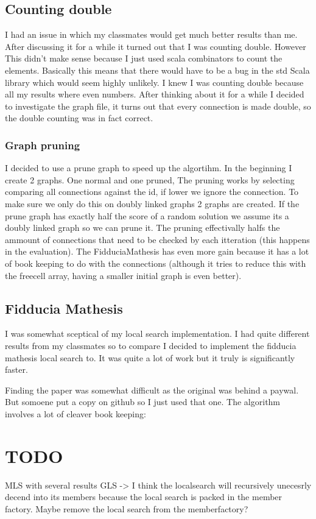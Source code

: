 \documentclass{article}
\begin{document}
\begin{empfile}
\subsection{Counting double}
I had an issue in which my classmates would get much better results than me.
After discussing it for a while it turned out that I was counting double. However
This didn't make sense because I just used scala combinators to count the 
elements. Basically this means that there would have to be a bug in the std
Scala library which would seem highly unlikely. I knew I was counting double
because all my results where even numbers. After thinking about it for a while
I decided to investigate the graph file, it turns out that every connection
is made double, so the double counting was in fact correct.

\subsubsection{Graph pruning}
I decided to use a prune graph to speed up the algortihm. In the beginning I
create 2 graphs. One normal and one pruned, The pruning works by selecting
comparing all connections against the id, if lower we ignore the connection.
To make sure we only do this on doubly linked graphs 2 graphs are created.
If the prune graph has exactly half the score of a random solution we assume
its a doubly linked graph so we can prune it.
The pruning effectivally halfs the ammount of connections that need to be
checked by each itteration (this happens in the evaluation). The
FidduciaMathesis has even more gain because it has a lot of book keeping to
do with the connections (although it tries to reduce this with the freecell
array, having a smaller initial graph is even better).

\subsection{Fidducia Mathesis}
I was somewhat sceptical of my local search implementation. I had quite 
different results from my classmates so to compare I decided to implement
the fidducia mathesis local search to. It was quite a lot of work but it
truly is significantly faster.

Finding the paper was somewhat difficult as the original was behind a paywal.
But somoene put a copy on github so I just used that one. The algorithm 
involves a lot of cleaver book keeping:




\section{TODO}
MLS with several results
GLS -> I think the localsearch will recursively unecesrly decend into its members
because the local search is packed in the member factory. Maybe remove the
local search from the memberfactory?



\end{empfile}
\end{document}
